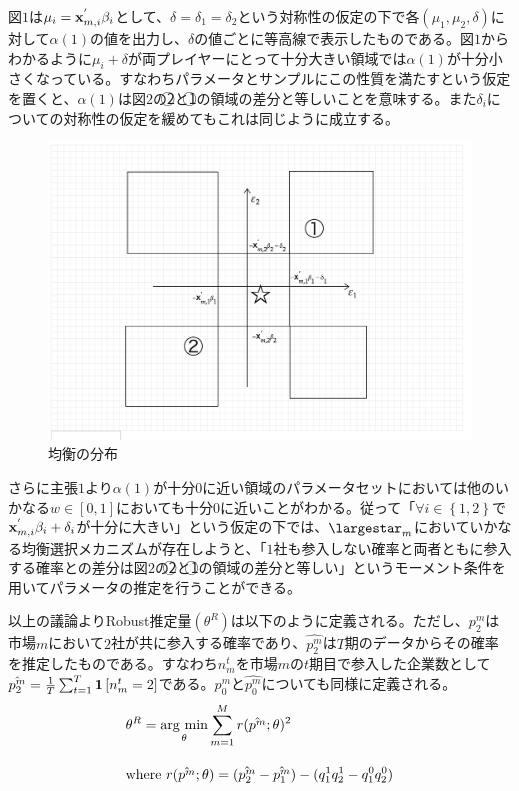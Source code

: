 \documentclass{jsarticle}
\newcommand{\argmin}{\mathop{\rm arg~min}\limits}
\begin{document}
図$1$は$\mu_i = {\bf x}_{m, i}^{'} \beta_i$として、$\delta = \delta_1 = \delta_2$という対称性の仮定の下で各$(\mu_1, \mu_2, \delta)$に対して$\alpha(1)$の値を出力し、$\delta$の値ごとに等高線で表示したものである。図$1$からわかるように$\mu_i + \delta$が両プレイヤーにとって十分大きい領域では$\alpha(1)$が十分小さくなっている。すなわちパラメータとサンプルにこの性質を満たすという仮定を置くと、$\alpha(1)$は図$2$の\textcircled{\scriptsize 2}と\textcircled{\scriptsize 1}の領域の差分と等しいことを意味する。また$\delta_i$についての対称性の仮定を緩めてもこれは同じように成立する。

\begin{figure}[t]
\centering
\includegraphics[scale = 0.3]{brgraph.png}
\caption{均衡の分布}
\end{figure}

さらに主張$1$より$\alpha(1)$が十分$0$に近い領域のパラメータセットにおいては他のいかなる$w \in [0,1]$においても十分$0$に近いことがわかる。従って「$\forall i \in \left\{ 1,2\right\}$で${\bf x}_{m, i}^{'} \beta_i + \delta_i$が十分に大きい」という仮定の下では、$\largestar_m$においていかなる均衡選択メカニズムが存在しようと、「$1$社も参入しない確率と両者ともに参入する確率との差分は図$2$の\textcircled{\scriptsize 2}と\textcircled{\scriptsize 1}の領域の差分と等しい」というモーメント条件を用いてパラメータの推定を行うことができる。

以上の議論よりRobust推定量$(\theta^R)$は以下のように定義される。ただし、$p_2^m$は市場$m$において$2$社が共に参入する確率であり、$\hat{p_2^m}$は$T$期のデータからその確率を推定したものである。すなわち$n_m^t$を市場$m$の$t$期目で参入した企業数として$\hat{p_2^m} = \frac{1}{T} \sum_{t = 1}^T {\bf 1}\left[ n_m^t = 2 \right]$である。$p_0^m$と$\hat{p_0^m}$についても同様に定義される。
\begin{align*}
	&\theta^R = \argmin_{\theta} \sum_{m = 1}^M r(\hat{p^m} ; \theta)^2\\[10pt]
	&\text{where}\ r(\hat{p^m} ; \theta) = (\hat{p_2^m} - \hat{p_1^m}) - (q_1^1 q_2^1 - q_1^0 q_2^0)
\end{align*}
\end{document}
